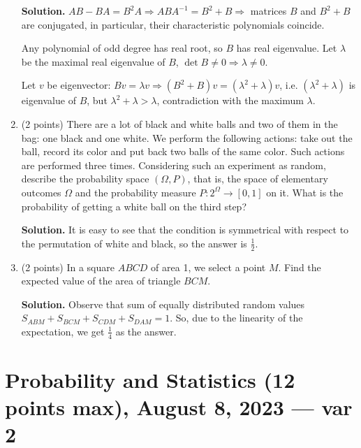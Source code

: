 \documentclass{article}
\begin{document}
\begin{enumerate}
  \textbf{Solution.} $AB - BA = B^2A \Rightarrow ABA^{-1} = B^2 + B \Rightarrow$ 
  matrices $B$ and $B^2 + B$ are conjugated, in particular, their 
  characteristic polynomials coincide.

  Any polynomial of odd degree has real root, so $B$ has real eigenvalue. 
  Let $\lambda$ be the maximal real eigenvalue of $B$, 
  $\det B \neq 0 \Rightarrow \lambda \neq 0$. 

  Let $v$ be eigenvector: $Bv = \lambda v \Rightarrow (B^2 + B)v = (\lambda^2 + \lambda)v$, i.e. 
  $(\lambda^2 + \lambda)$ is eigenvalue of $B$, but $\lambda^2 + \lambda > \lambda$, 
  contradiction with the maximum $\lambda$.

  \item (2 points) There are a lot of black and white balls and 
  two of them in the bag: one black and one white. 
  We perform the following actions: take out the ball, 
  record its color and put back two balls of the same color. 
  Such actions are performed three times. Considering such 
  an experiment as random, describe the probability space $(\Omega, P)$, 
  that is, the space of elementary outcomes $\Omega$ and 
  the probability measure $P: 2^{\Omega} \rightarrow [0, 1]$ on it. 
  What is the probability of getting a white ball on the third step?

  \textbf{Solution.} It is easy to see that the condition is symmetrical 
  with respect to the permutation of white and black, so the answer is $\frac{1}{2}$.

  \item (2 points) In a square $ABCD$ of area 1, we select a point $M$. 
  Find the expected value of the area of triangle $BCM$.

  \textbf{Solution.} Observe that sum of equally distributed random values $S_{ABM} + S_{BCM} + S_{CDM} + S_{DAM} = 1$. 
  So, due to the linearity of the expectation, we get $\frac{1}{4}$ as the answer.
\end{enumerate}

\newpage
\section*{Probability and Statistics (12 points max), August 8, 2023 — var 2}
\end{document}
